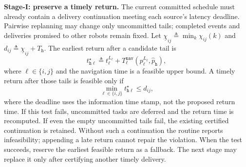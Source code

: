 \begin{revision}
\textbf{Stage-I: preserve a timely return.}
The current committed schedule must already contain a delivery continuation
meeting each source's latency deadline. Pairwise replanning may change only
uncommitted tails; completed events and deliveries promised to other robots
remain fixed. Let
$\underline\chi_{ij}\triangleq\min_k\chi_{ij}(k)$ and
$d_{ij}\triangleq\underline\chi_{ij}+T_{\texttt h}$.
The earliest return after a candidate tail is
\begin{equation}
\label{ch05:eq:estret}
t_{\texttt h\ell}^\star\triangleq
 t_\ell^{L_\ell}+T_\ell^{\texttt{nav}}
 (p_\ell^{L_\ell},\widehat p_{\texttt h}),
\end{equation}
where $\ell\in\{i,j\}$ and the navigation time is a feasible upper bound.
A timely return after those tails is feasible only if
\begin{equation}
\label{ch05:eq:return_cond}
\min_{\ell\in\{i,j\}}t_{\texttt h\ell}^\star\le d_{ij},
\end{equation}
where the deadline uses the information time stamp, not the proposed return
time. If this test fails, uncommitted tasks are deferred and the return time
is recomputed. If even the empty uncommitted tails fail, the existing
certified continuation is retained. Without such a continuation the routine
reports infeasibility; appending a late return cannot repair the violation.
When the test succeeds, reserve the earliest feasible return as a fallback.
The next stage may replace it only after certifying another timely delivery.
\end{revision}

